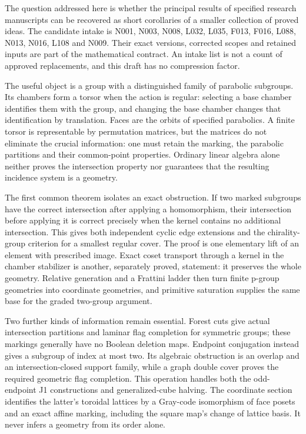 \documentclass[
  10pt,
  letterpaper,
]{article}
\author{}
\date{}
\begin{document}
The question addressed here is whether the principal results of
specified research manuscripts can be recovered as short corollaries of
a smaller collection of proved ideas. The candidate intake is N001,
N003, N008, L032, L035, F013, F016, L088, N013, N016, L108 and N009.
Their exact versions, corrected scopes and retained inputs are part of
the mathematical contract. An intake list is not a count of approved
replacements, and this draft has no compression factor.

The useful object is a group with a distinguished family of parabolic
subgroups. Its chambers form a torsor when the action is regular:
selecting a base chamber identifies them with the group, and changing
the base chamber changes that identification by translation. Faces are
the orbits of specified parabolics. A finite torsor is representable by
permutation matrices, but the matrices do not eliminate the crucial
information: one must retain the marking, the parabolic partitions and
their common-point properties. Ordinary linear algebra alone neither
proves the intersection property nor guarantees that the resulting
incidence system is a geometry.

The first common theorem isolates an exact obstruction. If two marked
subgroups have the correct intersection after applying a homomorphism,
their intersection before applying it is correct precisely when the
kernel contains no additional intersection. This gives both independent
cyclic edge extensions and the chirality-group criterion for a smallest
regular cover. The proof is one elementary lift of an element with
prescribed image. Exact coset transport through a kernel in the chamber
stabilizer is another, separately proved, statement: it preserves the
whole geometry. Relative generation and a Frattini ladder then turn
finite p-group geometries into coordinate geometries, and primitive
saturation supplies the same base for the graded two-group argument.

Two further kinds of information remain essential. Forest cuts give
actual intersection partitions and laminar flag completion for symmetric
groups; these markings generally have no Boolean deletion maps. Endpoint
conjugation instead gives a subgroup of index at most two. Its algebraic
obstruction is an overlap and an intersection-closed support family,
while a graph double cover proves the required geometric flag
completion. This operation handles both the odd-endpoint J1
constructions and generalized-cube halving. The coordinate section
identifies the latter's toroidal lattices by a Gray-code isomorphism of
face posets and an exact affine marking, including the square map's
change of lattice basis. It never infers a geometry from its order
alone.
\end{document}
